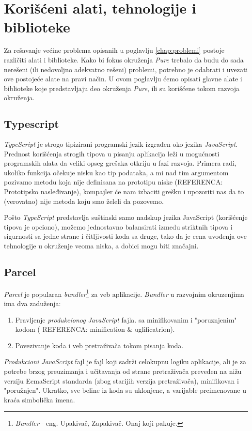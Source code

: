 \documentclass[12pt,oneside]{memoir}
\begin{document}
\section{Korišćeni alati, tehnologije i biblioteke}
Za rešavanje većine problema opisanih u poglavlju \ref{chap:problemi} postoje različiti alati i biblioteke. 
Kako bi fokus okruženja \emph{Pure} trebalo da budu do sada nerešeni (ili nedovoljno adekvatno rešeni) problemi,
potrebno je odabrati i uvezati ove postojeće alate na pravi način. U ovom poglavlju ćemo opisati glavne
alate i biblioteke koje predstavljaju deo okruženja \emph{Pure}, ili su korišćene tokom razvoja okruženja.

\subsection{Typescript}
\emph{TypeScript} je strogo tipizirani programski jezik izgrađen oko jezika \emph{JavaScript}.
Prednost korišćenja strogih tipova u pisanju aplikacija leži u mogućnosti programskih alata
da veliki opseg grešaka otkriju u fazi razvoja. Primera radi, ukoliko funkcija očekuje nisku
kao tip podataka, a mi nad tim argumentom pozivamo metodu koja nije definisana na prototipu niske (REFERENCA: Prototipsko nasleđivanje),
kompajler će nam izbaciti grešku i upozoriti nas da to (verovatno) nije metoda koju smo želeli da pozovemo.

Pošto \emph{TypeScript} predstavlja suštinski samo nadskup jezika JavaScript (korišćenje tipova je opciono),
možemo jednostavno balansirati između striktnih tipova i sigurnosti sa jedne strane i čitljivosti koda sa druge,
tako da je cena uvođenja ove tehnologije u okruženje veoma niska, a dobici mogu biti značajni.
\subsection{Parcel}
\emph{Parcel} je popularan \emph{bundler}\footnote{\emph{Bundler} - eng. Upakivač, Zapakivač. Onaj koji pakuje.} za veb aplikacije.
\emph{Bundler} u razvojnim okruzenjima ima dva zaduženja:
\begin{enumerate}
  \item Pravljenje \emph{produkcionog} \emph{JavaScript} fajla. sa minifikovanim i "poruznjenim" kodom (
    REFERENCA: minification \& uglificatrion).
  \item Povezivanje koda i veb pretraživača tokom pisanja koda.
\end{enumerate} 
\emph{Produkcioni JavaScript} fajl je fajl koji sadrži celokupnu logiku aplikacije, ali je za potrebe brzog preuzimanja i
učitavanja od strane pretraživača preveden na nižu verziju EcmaScript standarda (zbog starijih verzija pretraživača), minifikovan i "poružnjen".
Ukratko, sve beline iz koda su uklonjene, a varijable preimenovane u kraća simbolička imena.
\end{document}
